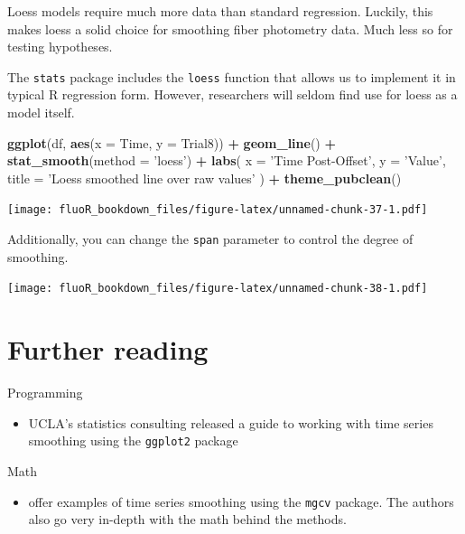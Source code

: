 \documentclass[
]{book}
\newenvironment{Shaded}{\begin{snugshade}}{\end{snugshade}}
\newcommand{\DataTypeTok}[1]{\textcolor[rgb]{0.13,0.29,0.53}{#1}}
\newcommand{\KeywordTok}[1]{\textcolor[rgb]{0.13,0.29,0.53}{\textbf{#1}}}
\newcommand{\NormalTok}[1]{#1}
\newcommand{\OperatorTok}[1]{\textcolor[rgb]{0.81,0.36,0.00}{\textbf{#1}}}
\newcommand{\StringTok}[1]{\textcolor[rgb]{0.31,0.60,0.02}{#1}}
\providecommand{\tightlist}{%
  \setlength{\itemsep}{0pt}\setlength{\parskip}{0pt}}
\begin{document}
Loess models require much more data than standard regression. Luckily, this makes loess a solid choice for smoothing fiber photometry data. Much less so for testing hypotheses.

The \texttt{stats} package includes the \texttt{loess} function that allows us to implement it in typical R regression form. However, researchers will seldom find use for loess as a model itself.

\begin{Shaded}
\begin{Highlighting}[]
\KeywordTok{ggplot}\NormalTok{(df, }\KeywordTok{aes}\NormalTok{(}\DataTypeTok{x =}\NormalTok{ Time, }\DataTypeTok{y =}\NormalTok{ Trial8)) }\OperatorTok{+}
\StringTok{  }\KeywordTok{geom_line}\NormalTok{() }\OperatorTok{+}
\StringTok{  }\KeywordTok{stat_smooth}\NormalTok{(}\DataTypeTok{method =} \StringTok{'loess'}\NormalTok{) }\OperatorTok{+}
\StringTok{  }\KeywordTok{labs}\NormalTok{(}
    \DataTypeTok{x =} \StringTok{'Time Post-Offset'}\NormalTok{,}
    \DataTypeTok{y =} \StringTok{'Value'}\NormalTok{,}
    \DataTypeTok{title =} \StringTok{'Loess smoothed line over raw values'}
\NormalTok{    ) }\OperatorTok{+}
\StringTok{  }\KeywordTok{theme_pubclean}\NormalTok{()}
\end{Highlighting}
\end{Shaded}

\texttt{[image: fluoR\_bookdown\_files/figure-latex/unnamed-chunk-37-1.pdf]}

Additionally, you can change the \texttt{span} parameter to control the degree of smoothing.

\texttt{[image: fluoR\_bookdown\_files/figure-latex/unnamed-chunk-38-1.pdf]}

\hypertarget{vis-furtherreading}{%
\section{Further reading}\label{vis-furtherreading}}

Programming

\begin{itemize}
\tightlist
\item
  UCLA's statistics consulting released a guide to working with time series smoothing using the \texttt{ggplot2} package \citep{ucla_smoothing}
\end{itemize}

Math

\begin{itemize}
\tightlist
\item
  \citep{wood_smoothing_2016} offer examples of time series smoothing using the \texttt{mgcv} package. The authors also go very in-depth with the math behind the methods.
\end{itemize}
\end{document}
